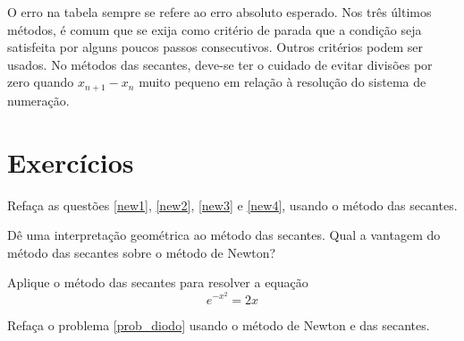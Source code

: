 \begin{obs}
O erro na tabela sempre se refere ao erro absoluto esperado. Nos três últimos métodos, é comum que se exija como critério de parada que a condição seja satisfeita por alguns poucos passos consecutivos. Outros critérios podem ser usados. No métodos das secantes, deve-se ter o cuidado de evitar divisões por zero quando $x_{n+1}-x_n$ muito pequeno em relação à resolução do sistema de numeração.  
\end{obs}

\section*{Exercícios}

\begin{Exercise} Refaça as questões \ref{new1}, \ref{new2}, \ref{new3}  e \ref{new4}, usando o método das secantes.
\end{Exercise}

\begin{Exercise} Dê uma interpretação geométrica ao método das secantes. Qual a vantagem do método das secantes sobre o método de Newton?
\end{Exercise}

\begin{Exercise} Aplique o método das secantes para resolver a equação
  \begin{equation*}
    e^{-x^2}=2x  
  \end{equation*}
\end{Exercise}

\begin{Exercise} Refaça o problema \ref{prob_diodo} usando o método de Newton e das secantes.
\end{Exercise}

